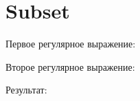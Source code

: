 \section{Subset}
\begin{frame}{}
	Первое регулярное выражение:


	Второе регулярное выражение:


	Результат:

\end{frame}
